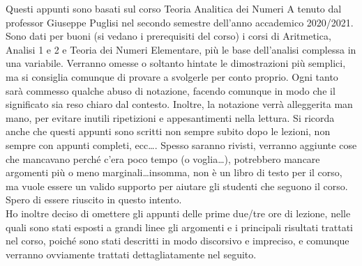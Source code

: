 Questi appunti sono basati sul corso Teoria Analitica dei Numeri A tenuto dal professor Giuseppe Puglisi nel secondo semestre dell'anno accademico 2020/2021. Sono dati per buoni (si vedano i prerequisiti del corso) i corsi di Aritmetica, Analisi 1 e 2 e Teoria dei Numeri Elementare, più le base dell'analisi complessa in una variabile. Verranno omesse o soltanto hintate le dimostrazioni più semplici, ma si consiglia comunque di provare a svolgerle per conto proprio. Ogni tanto sarà commesso qualche abuso di notazione, facendo comunque in modo che il significato sia reso chiaro dal contesto. Inoltre, la notazione verrà alleggerita man mano, per evitare inutili ripetizioni e appesantimenti nella lettura. Si ricorda anche che questi appunti sono scritti non sempre subito dopo le lezioni, non sempre con appunti completi, ecc\dots. Spesso saranno rivisti, verranno aggiunte cose che mancavano perché c'era poco tempo (o voglia\dots), potrebbero mancare argomenti più o meno marginali\dots insomma, non è un libro di testo per il corso, ma vuole essere un valido supporto per aiutare gli studenti che seguono il corso. Spero di essere riuscito in questo intento. \\

Ho inoltre deciso di omettere gli appunti delle prime due/tre ore di lezione, nelle quali sono stati esposti a grandi linee gli argomenti e i principali risultati trattati nel corso, poiché sono stati descritti in modo discorsivo e impreciso, e comunque verranno ovviamente trattati dettagliatamente nel seguito.
